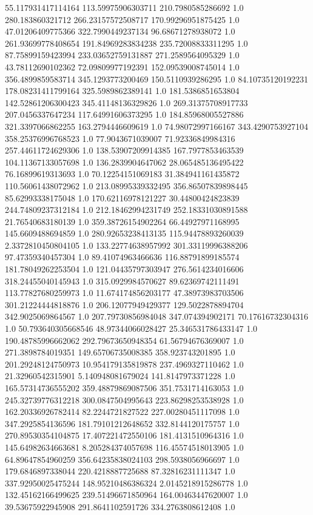 55.117931417114164	113.59975906303711	210.7980585286692	1.0
280.183860321712	266.23157572508717	170.99296951875425	1.0
47.01206409775366	322.7990449237134	96.68671278938072	1.0
261.93699778408654	191.84969283834238	235.72008833311295	1.0
87.75899159423994	233.03652759131887	271.2589564095329	1.0
43.78112690102362	72.09809977192391	152.09539008745014	1.0
356.4899859583714	345.1293773200469	150.5110939286295	1.0
84.10735120192231	178.08231411799164	325.5989862389141	1.0
181.5386851653804	142.52861206300423	345.41148136329826	1.0
269.31375708917733	207.0456337647234	117.64991606373295	1.0
184.85968005527886	321.3397066862255	163.2794446609619	1.0
74.98072997166167	343.4290753927104	358.25376996768523	1.0
77.9043671039007	71.92336849984316	257.44611724629306	1.0
138.53907209914385	167.7977853463539	104.11367133057698	1.0
136.2839904647062	28.065485136495422	76.16899619313693	1.0
70.12254151069183	31.384941161435872	110.56061438072962	1.0
213.08995339332495	356.86507839898445	85.62993338175048	1.0
170.62116978121227	30.44800424823839	244.74809237312184	1.0
212.18462994231749	252.18331030891588	21.76540683180139	1.0
359.38726154902264	66.44927971168995	145.6609488694859	1.0
280.92653238413135	115.94478893260039	2.3372810450804105	1.0
133.22774638957992	301.33119996388206	97.47359340457304	1.0
89.41074963466636	116.88791899185574	181.78049262253504	1.0
121.04435797303947	276.5614234016606	318.24455040145943	1.0
315.0929984570627	89.62369742111491	113.77827680259973	1.0
11.674174856203177	47.38973983703506	301.21224444818876	1.0
206.12077949429377	129.5022878894704	342.9025069864567	1.0
207.79730856984048	347.074394902171	70.17616732304316	1.0
50.793640305668546	48.97344066028427	25.346531786433147	1.0
190.48785996662062	292.79673650948354	61.56794676369007	1.0
271.3898784019351	149.65706735008385	358.923743201895	1.0
201.29248124750973	10.954179135819878	237.4969327110462	1.0
21.32960542315901	5.140948081679024	141.8147973371228	1.0
165.57314736555202	359.48879869087506	351.7531714163053	1.0
245.32739776312218	300.0847504995643	223.86298253538928	1.0
162.20336926782414	82.2244721827522	227.00280451117098	1.0
347.2925854136596	181.79101212648652	332.8144120175757	1.0
270.89530354104875	17.407221472550106	181.4131510964316	1.0
145.64982634663681	8.205284374057698	116.45574518013905	1.0
64.89647854960259	356.64235838024103	298.5938056966697	1.0
179.6846897338044	220.4218887725688	87.32816231111347	1.0
337.92950025475244	148.95210486386324	2.0145218915286778	1.0
132.45162166499625	239.51496671850964	164.00463447620007	1.0
39.53675922945908	291.8641102591726	334.2763808612408	1.0
